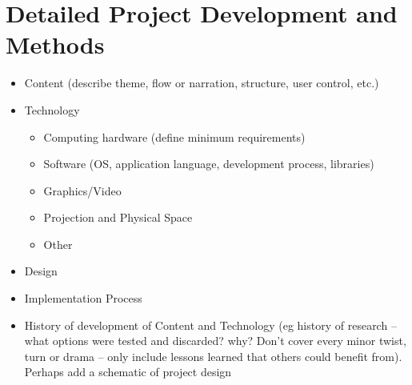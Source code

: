 \chapter{Detailed Project Development and Methods}

\begin{itemize}
\item Content (describe theme, flow or narration, structure, user control, etc.)
\item Technology
    \begin{itemize}
	\item Computing hardware (define minimum requirements)
    \item Software (OS, application language, development process, libraries)
	\item Graphics/Video
	\item Projection and Physical Space
    \item Other 
    \end{itemize}
\item Design
\item Implementation Process
\item History of development of Content and Technology (eg history of research -- what options were tested and discarded? why? Don’t cover every\cite{shannon-weaver} minor twist, turn or drama -- only include lessons learned that others could benefit from). Perhaps add a schematic of project design
\end{itemize}
